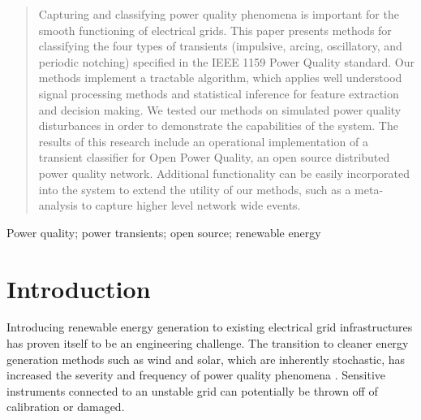 \documentclass[10pt, conference, compsocconf]{IEEEtran}
\begin{document}




\maketitle


\begin{abstract}

Capturing and classifying power quality phenomena is important for the smooth functioning of electrical grids.  This paper presents methods for classifying the four types of transients (impulsive, arcing, oscillatory, and periodic notching) specified in the IEEE 1159 Power Quality standard. Our methods implement a tractable algorithm, which applies well understood signal processing methods and statistical inference for feature extraction and decision making. We tested our methods on simulated power quality disturbances in order to demonstrate the capabilities of the system. The results of this research include an operational implementation of a transient classifier for Open Power Quality, an open source distributed power quality network. Additional functionality can be easily incorporated into the system to extend the utility of our methods, such as a meta-analysis to capture higher level network wide events.

\end{abstract}

\begin{IEEEkeywords}
Power quality; power transients; open source; renewable energy%
\end{IEEEkeywords}



%
\IEEEpeerreviewmaketitle



\section{Introduction}

Introducing renewable energy generation to existing electrical grid infrastructures has proven itself to be an engineering challenge. The transition to cleaner energy generation methods such as wind and solar, which are inherently stochastic, has increased the severity and frequency of power quality phenomena \cite{Radu:2014:RenewableImpacts}. Sensitive instruments connected to an unstable grid can potentially be thrown off of calibration or damaged.
\end{document}
